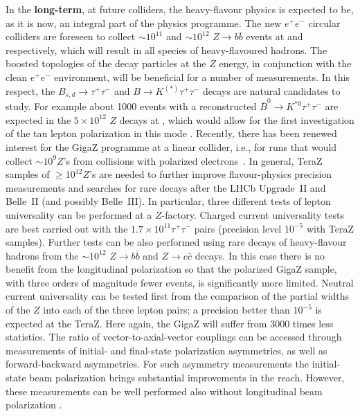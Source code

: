 In the {\bf long-term},
at future colliders, the heavy-flavour physics is expected to be, as it is now, an integral part of the physics programme.
The new $e^+e^-$  circular colliders 
are foreseen to collect 
 $\sim 10^{ 11}$ and 
 $ \sim  10^{12}$ 
 $Z \to b \bar b$ events at 
\CEPC \cite{CEPC_INPUT} and \FCCee  \cite{Blondel:2019yqr} respectively, which  will result in all species of heavy-flavoured hadrons.
 The boosted topologies of the decay particles at the $Z$ energy, in conjunction with the clean $e^+e^-$ environment, will be beneficial for a number of measurements. 
In this respect, the $B_{s,d} \to \tau^+\tau^-$ and  $ B \to K^{(*)} \tau^+ \tau^-$ decays are  natural candidates to study. For example about 1000  events with a reconstructed  $\bar {B}^0 \to K^{*0} \tau^+\tau^-$ are expected in the $5 \times 10^{12}$ $Z$ decays at \FCCee, which would 
allow for the first investigation of  the tau lepton polarization in this mode 
\cite{Kamenik:2017ghi}. 
Recently, there has been renewed interest for the GigaZ programme at a linear collider, i.e., for runs that would collect $\sim 10^9 Z$'s from collisions with polarized electrons~\cite{Irles:2019xny}.
In general, TeraZ samples  of $\ge 10^{12} Z$'s are needed to further improve flavour-physics precision measurements and searches for rare decays after the LHCb Upgrade~II and   Belle~II (and possibly Belle~III).  
In particular, three different tests of lepton universality can be performed at a $Z$-factory. Charged current universality tests are best carried out with the $1.7 \times 10^{11}  \tau^+ \tau^-$ pairs (precision level $10^{-5}$ with TeraZ samples).
Further tests can be also performed using rare decays of heavy-flavour hadrons from the $\sim 10^{12}$ $Z\to b\bar b$  and $Z\to c \bar c$ decays.
In this case there is no benefit from the longitudinal polarization so that the polarized GigaZ sample, with three orders of magnitude fewer events, is significantly more limited. 
Neutral current universality can be tested first from the comparison of the partial widths of the $Z$ into each of the three lepton pairs; a precision better than $10^{-5}$ is expected at the TeraZ. Here again, the GigaZ will  suffer from 3000 times less statistics. 
 The ratio of vector-to-axial-vector couplings can be accessed through measurements of initial- and final-state polarization asymmetries, as well as forward-backward asymmetries. For such asymmetry measurements  the initial-state beam polarization brings substantial improvements in the reach. However, these measurements can be well performed also without longitudinal beam polarization 
 \cite{Blondel:2019yqr}.

